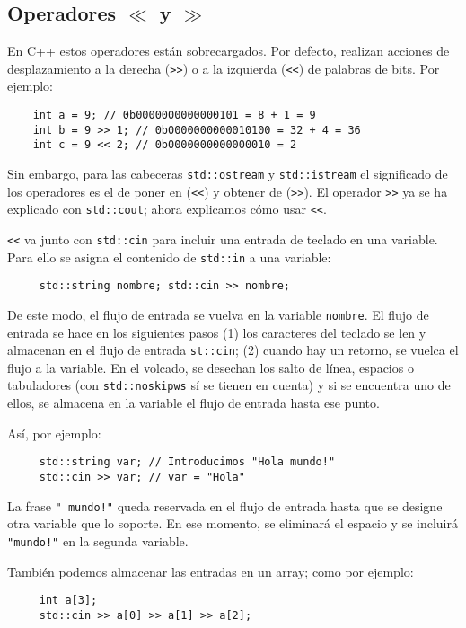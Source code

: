 \documentclass[a4paper]{article}
\begin{document}
	\subsection{Operadores $\ll$ y $\gg$}
	En C++ estos operadores están sobrecargados. Por defecto, realizan acciones de desplazamiento a la derecha (\verb|>>|) o a la izquierda (\verb|<<|) de palabras de bits. Por ejemplo:
	\begin{lstlisting}
	int a = 9; // 0b0000000000000101 = 8 + 1 = 9
	int b = 9 >> 1; // 0b0000000000010100 = 32 + 4 = 36
	int c = 9 << 2; // 0b0000000000000010 = 2
	\end{lstlisting}
	 
	 Sin embargo, para las cabeceras \verb|std::ostream| y \verb|std::istream| el significado de los operadores es el de poner en (\verb|<<|) y obtener de (\verb|>>|). El operador \verb|>>| ya se ha explicado con \verb|std::cout|; ahora explicamos cómo usar \verb|<<|. 
	 
	 \verb|<<| va junto con \verb|std::cin| para incluir una entrada de teclado en una variable. Para ello se asigna el contenido de \verb|std::in| a una variable:
	 \begin{lstlisting}
	 std::string nombre; std::cin >> nombre;
	 \end{lstlisting}
	 De este modo, el flujo de entrada se vuelva en la variable \verb|nombre|. El flujo de entrada se hace en los siguientes pasos (1) los caracteres del teclado se len y almacenan en el flujo de entrada \verb|st::cin|; (2) cuando hay un retorno, se vuelca el flujo a la variable. En el volcado, se desechan los salto de línea, espacios o tabuladores (con \verb|std::noskipws| sí se tienen en cuenta) y si se encuentra uno de ellos, se almacena en la variable el flujo de entrada hasta ese punto. 
	 
	 Así, por ejemplo:\begin{lstlisting}
	 std::string var; // Introducimos "Hola mundo!"
	 std::cin >> var; // var = "Hola"
	 \end{lstlisting}
	 
	 La frase \verb|" mundo!"| queda reservada en el flujo de entrada hasta que se designe otra variable que lo soporte. En ese momento, se eliminará el espacio y se incluirá \verb|"mundo!"| en la segunda variable.
	 
	 También podemos almacenar las entradas en un array; como por ejemplo:
	 \begin{lstlisting}
	 int a[3];
	 std::cin >> a[0] >> a[1] >> a[2];
	 \end{lstlisting}
	 
\end{document}
